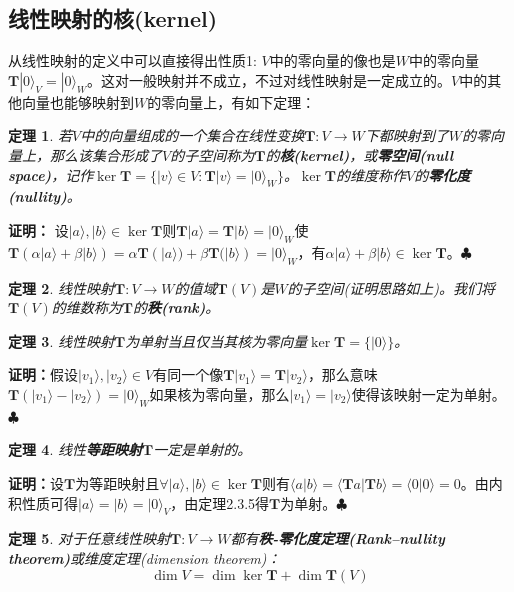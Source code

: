 \documentclass[mathserif,hyperref,UTF8,openany,b5paper]{ctexbook}
\newtheorem{thm}{定理}[section]
\begin{document}
\subsection{线性映射的核(kernel)}
从线性映射的定义中可以直接得出性质1: $V$中的零向量的像也是$W$中的零向量$\mathbf{T}|0\rangle_V=|0\rangle_W$。这对一般映射并不成立，不过对线性映射是一定成立的。$V$中的其他向量也能够映射到$W$的零向量上，有如下定理：
\begin{thm}
若$V$中的向量组成的一个集合在线性变换$\mathbf{T}:V\xrightarrow{}W$下都映射到了$W$的零向量上，那么该集合形成了$V$的子空间称为$\mathbf{T}$的\textbf{核(kernel)}，或\textbf{零空间(null space)}，记作$\ker\mathbf{T}=\{|v\rangle \in V:\mathbf{T}|v\rangle=|0\rangle_W\}$。$\ker\mathbf{T}$的维度称作$V$的\textbf{零化度(nullity)}。
\end{thm}
\textbf{证明：} 设$|a\rangle,|b\rangle\in\ker\mathbf{T}$则$\mathbf{T}|a\rangle=\mathbf{T}|b\rangle=|0\rangle_W$使$\mathbf{T}(\alpha|a\rangle+\beta|b\rangle)=\alpha\mathbf{T}(|a\rangle)+\beta\mathbf{T}(|b\rangle)=|0\rangle_W$，有$\alpha|a\rangle+\beta|b\rangle\in\ker\mathbf{T}$。$\clubsuit$
\begin{thm}
线性映射$\mathbf{T}:V\xrightarrow{}W$的值域$\mathbf{T}(V)$是$W$的子空间(证明思路如上)。我们将$\mathbf{T}(V)$的维数称为$\mathbf{T}$的\textbf{秩(rank)}。
\end{thm}
\begin{thm}
线性映射$\mathbf{T}$为单射当且仅当其核为零向量$\ker\mathbf{T}=\{|0\rangle\}$。
\end{thm}
\textbf{证明：}假设$|v_1\rangle,|v_2\rangle\in V$有同一个像$\mathbf{T}|v_1\rangle=\mathbf{T}|v_2\rangle
$，那么意味$\mathbf{T}(|v_1\rangle-|v_2\rangle)=|0\rangle_W$如果核为零向量，那么$|v_1\rangle=|v_2\rangle$使得该映射一定为单射。$\clubsuit$
\begin{thm}
线性\textbf{等距映射}$\mathbf{T}$一定是单射的。
\end{thm}
\textbf{证明：}设$\mathbf{T}$为等距映射且$\forall|a\rangle,|b\rangle\in\ker\mathbf{T}$则有$\langle a|b\rangle=\langle\mathbf{T}a|\mathbf{T}b\rangle=\langle 0|0 \rangle = 0$。由内积性质可得$|a\rangle=|b\rangle=|0\rangle_V$，由定理2.3.5得$\mathbf{T}$为单射。$\clubsuit$
\begin{thm}
对于任意线性映射$\mathbf{T}:V\xrightarrow{}W$都有\textbf{秩-零化度定理(Rank–nullity theorem)}或维度定理(dimension theorem)：
\begin{equation}
    \dim V=\dim\ker\mathbf{T}+\dim\mathbf{T}(V)
\end{equation}
\end{thm}
\end{document}
